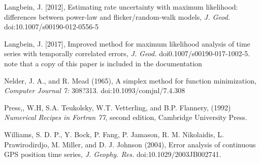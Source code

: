 \documentclass[12pt]{amsart}
\begin{document}
Langbein, J. [2012], Estimating rate uncertainty with maximum likelihood: differences between power-law and flicker/random-walk 
models, \textit{J. Geod.} doi:{10.1007/s00190-012-0556-5}

Langbein, J. [2017], Improved method for maximum likelihood analysis of time series with temporally correlated errors,
\textit{J. Geod.} doi{0.1007/s00190-017-1002-5}.  note that a copy of this paper is included in the documentation

Nelder, J. A., and R. Mead (1965), A simplex method for function minimization, \textit{Computer Journal 7:} 308?313. doi:10.1093/comjnl/7.4.308

Press,, W.H, S.A. Teukolsky, W.T. Vetterling, and B.P. Flannery, (1992) \textit{Numerical Recipes in Fortran 77}, second edition,
Cambridge University Press.

Williams, S. D. P., Y. Bock, P. Fang, P. Jamason, R. M. Nikolaidis,
L. Prawirodirdjo, M. Miller, and D. J. Johnson (2004), Error analysis of continuous GPS position time series, 
 \textit{J.  Geophy. Res.}  doi:{10.1029/2003JB002741}.
\end{document}
